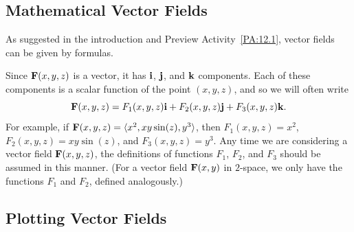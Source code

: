 \subsection*{Mathematical Vector Fields}

As suggested in the introduction and Preview Activity~\ref{PA:12.1},
vector fields can be given by formulas.

\vspace*{5pt}
\nin {} \vspace*{5pt}

Since $\mathbf{F}(x,y,z)$ is a vector, it has $\mathbf{i}$, $\mathbf{j}$, and $\mathbf{k}$
components. Each of these components is a scalar function of the point
$(x,y,z)$, and so we will often write
\[\mathbf{F}(x,y,z) = F_1(x,y,z)\mathbf{i} + F_2(x,y,z)\mathbf{j} + F_3(x,y,z)\mathbf{k}.\]
For example, if $\mathbf{F}(x,y,z) = \langle x^2,xy\sin(z),y^3\rangle$, then
$F_1(x,y,z) = x^2$, $F_2(x,y,z) = xy\sin(z)$, and $F_3(x,y,z) =
y^3$. Any time we are considering a vector field $\mathbf{F}(x,y,z)$, the
definitions of functions $F_1$, $F_2$, and $F_3$ should be assumed in
this manner. (For a vector field $\mathbf{F}(x,y)$ in $2$-space, we only have
the functions $F_1$ and $F_2$, defined analogously.)

\subsection*{Plotting Vector Fields}

